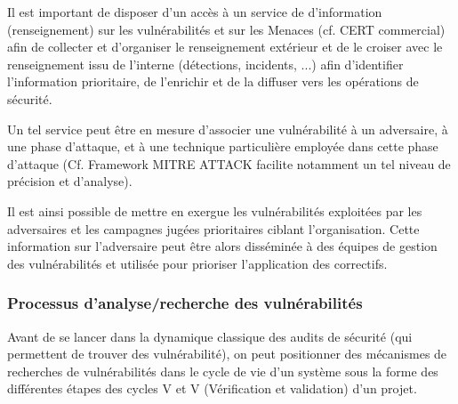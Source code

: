 Il est important de disposer d'un accès à un service  de d'information (renseignement) sur les vulnérabilités et sur les Menaces (cf. CERT commercial) afin de collecter et d’organiser le renseignement extérieur et de le croiser avec le renseignement issu de l’interne (détections, incidents, ...) afin d’identifier l'information prioritaire, de l’enrichir et de la diffuser vers les opérations de sécurité. 
 
Un tel service peut être en mesure d’associer une vulnérabilité à un adversaire, à une phase d’attaque, et à une technique particulière employée dans cette phase d’attaque (Cf. Framework MITRE ATTACK facilite notamment un tel niveau de précision et d’analyse).


Il est ainsi possible de mettre en exergue les vulnérabilités exploitées par les adversaires et les campagnes jugées prioritaires  ciblant l’organisation. Cette information sur l’adversaire peut être alors disséminée à des équipes de gestion des vulnérabilités et utilisée pour prioriser l’application des correctifs.



\subsubsection{Processus d’analyse/recherche des vulnérabilités}

Avant de se lancer dans la dynamique classique des audits de sécurité (qui permettent de trouver des vulnérabilité), on peut positionner des mécanismes de recherches de vulnérabilités dans le cycle de vie d'un système sous la forme des différentes étapes des cycles V et V (Vérification et validation) d'un projet.


